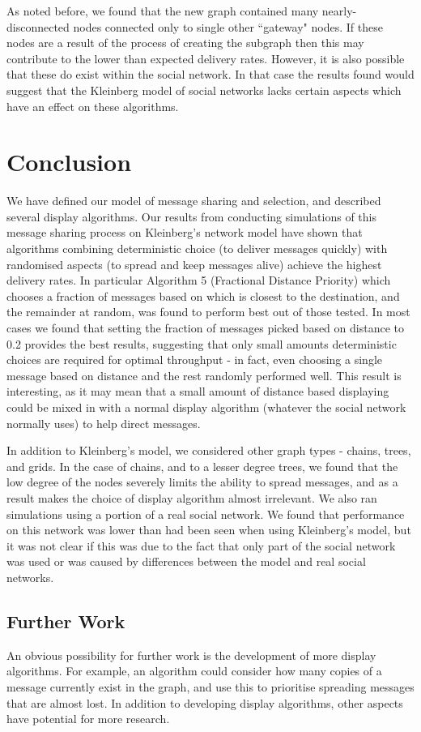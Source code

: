 \documentclass[bsc,frontabs,twoside,singlespacing,parskip,deptreport]{infthesis}     %
\begin{document}
As noted before, we found that the new graph contained many nearly-disconnected nodes connected only to single other ``gateway" nodes. If these nodes are a result of the process of creating the subgraph then this may contribute to the lower than expected delivery rates. However, it is also possible that these do exist within the social network. In that case the results found would suggest that the Kleinberg model of social networks lacks certain aspects which have an effect on these algorithms.

\chapter{Conclusion} \label{chapter5}
We have defined our model of message sharing and selection, and described several display algorithms. Our results from conducting simulations of this message sharing process on Kleinberg's network model have shown that algorithms combining deterministic choice (to deliver messages quickly) with randomised aspects (to spread and keep messages alive) achieve the highest delivery rates. In particular Algorithm 5 (Fractional Distance Priority) which chooses a fraction of messages based on which is closest to the destination, and the remainder at random, was found to perform best out of those tested. In most cases we found that setting the fraction of messages picked based on distance to 0.2 provides the best results, suggesting that only small amounts deterministic choices are required for optimal throughput - in fact, even choosing a single message based on distance and the rest randomly performed well. This result is interesting, as it may mean that a small amount of distance based displaying could be mixed in with a normal display algorithm (whatever the social network normally uses) to help direct messages.

In addition to Kleinberg's model, we considered other graph types - chains, trees, and grids. In the case of chains, and to a lesser degree trees, we found that the low degree of the nodes severely limits the ability to spread messages, and as a result makes the choice of display algorithm almost irrelevant. We also ran simulations using a portion of a real social network. We found that performance on this network was lower than had been seen when using Kleinberg's model, but it was not clear if this was due to the fact that only part of the social network was used or was caused by differences between the model and real social networks.

\section{Further Work}
An obvious possibility for further work is the development of more display algorithms. For example, an algorithm could consider how many copies of a message currently exist in the graph, and use this to prioritise spreading messages that are almost lost. In addition to developing display algorithms, other aspects have potential for more research.
\end{document}
